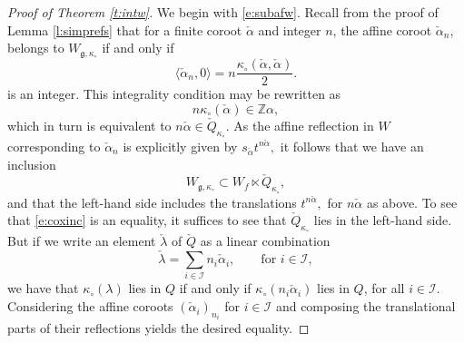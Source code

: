 \documentclass[11pt,reqno]{amsart}
\newcommand{\halpha}{\check{\alpha}}
\newcommand{\fg}{\mathfrak{g}}
\theoremstyle{remark}
\numberwithin{equation}{section}
\begin{document}
\begin{proof}[Proof of Theorem \ref{t:intw}] We begin with \eqref{e:subafw}. Recall from the proof of 
Lemma \ref{l:simprefs} that for a finite coroot $\halpha$ and integer 
$n$, the affine coroot $\halpha_n$, belongs to $W_{\fg, \kappa_\circ}$ if and 
only if
	\[ \langle \halpha_n, 0 \rangle = n\frac{\kappa_\circ( \halpha, 
		\halpha)}{2}.\]
	is an integer. This integrality condition may be rewritten as
	\[ n \kappa_\circ(\halpha) \in \mathbb{Z} \alpha, \]
	which in turn is equivalent to  $n \halpha \in \check{Q}_{\kappa_\circ}.$ 
    As the affine 
	reflection in $W$ corresponding to $\halpha_n$ 
	is explicitly given by $
	s_{\halpha} t^{n \halpha},$
	it follows that we have an inclusion 
	\begin{equation} \label{e:coxinc} W_{\fg, \kappa_\circ} \subset W_f \ltimes 
	\check{Q}_{\kappa_\circ},
	\end{equation}
	and that the left-hand side includes the translations $t^{n \halpha},$ for 
	$n \halpha$ as above. To see that \eqref{e:coxinc} is an equality, it 
	suffices to see that $\check{Q}_{\kappa_\circ}$ lies in the left-hand side. 
	But if we write an element $\check{\lambda}$ of $\check{Q}$ as a linear 
	combination
	\[ \check{\lambda} = \sum_{i \in \mathscr{I}} n_i \halpha_i, \quad \quad 
	\text{for } 
	i \in \mathscr{I},
	\]
	we have that $\kappa_\circ(\lambda)$ lies in $Q$ if and only if 
	$\kappa_\circ( n_i \halpha_i)$ lies in $Q$, for all $i \in \mathscr{I}$. 
	Considering 
	the affine coroots $(\halpha_i)_{n_i}$ for $i \in \mathscr{I}$ and 
	composing the
	translational parts of their reflections yields the desired equality. 
	

\end{proof}
\end{document}
